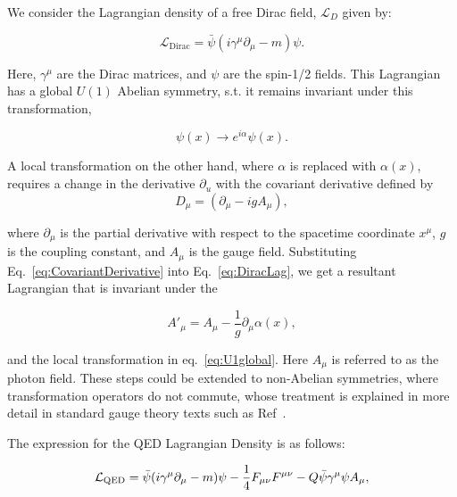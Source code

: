 We consider the Lagrangian density of a free Dirac field, $\mathcal{L}_D$ given by:

\begin{equation}
\label{eq:DiracLag}
    \mathcal{L}_{\text{Dirac}} = \bar{\psi}(i\gamma^\mu\partial_\mu - m)\psi. 
\end{equation}

Here, $\gamma^\mu$ are the Dirac matrices, and $\psi$ are the spin-1/2 fields. This Lagrangian has a global $U(1)$ Abelian symmetry, s.t. it remains invariant under this transformation,

\begin{equation}
\label{eq:U1global}
    \psi(x) \rightarrow e^{i\alpha} \psi(x).
\end{equation}

A local transformation on the other hand, where $\alpha$ is replaced with $\alpha(x)$, requires a change in the derivative $\partial_u$ with the covariant derivative defined by
\begin{equation}
\label{eq:CovariantDerivative}
    D_{\mu}  = (\partial_{\mu} - ig A_{\mu}) , 
\end{equation}

where $\partial_{\mu}$ is the partial derivative with respect to the spacetime coordinate $x^{\mu}$, $g$ is the coupling constant, and $A_{\mu}$ is the gauge field. Substituting Eq.~\ref{eq:CovariantDerivative} into Eq.~\ref{eq:DiracLag}, we get a resultant Lagrangian that is invariant under the 

\begin{equation}
\label{eq:AuGaugeTransformation}
   A'_{\mu} = A_{\mu} - \frac{1}{g} \partial_{\mu} \alpha(x), 
\end{equation}

and the local transformation in eq.~\ref{eq:U1global}. Here $A_\mu$ is referred to as the photon field. These steps could be extended to non-Abelian symmetries, where transformation operators do not commute, whose treatment is explained in more detail in standard gauge theory texts such as Ref~\cite{Peskin:1995ev}.

The expression for the QED Lagrangian Density is as follows:

\begin{equation}
\label{eq:QEDLagrangian}
\mathcal{L}_{\textnormal{QED}} = \bar{\psi} (i \gamma^{\mu} \partial_{\mu} - m) \psi - \frac{1}{4} F_{\mu\nu} F^{\mu\nu} - Q \bar{\psi} \gamma^{\mu} \psi A_{\mu},
\end{equation}

